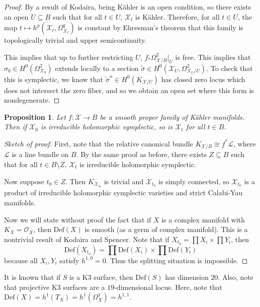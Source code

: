 \documentclass[leqno, openany]{memoir}
\newtheorem{prop}[thm]{Proposition}
\theoremstyle{definition}
\theoremstyle{remark}
\theoremstyle{plain}
\theoremstyle{definition}
\theoremstyle{remark}
\newcommand{\mc}[1]{\mathcal{#1}}
\newcommand{\mr}[1]{\mathrm{#1}}
\newcommand{\wt}[1]{\widetilde{#1}}
\begin{document}
\begin{proof}
    By a result of Kodaira, being K\"ahler is an open condition, so there exists an open $U \subseteq B$ such that for all $t \in U$, $\mc{X}_t$ is K\"ahler. Therefore, for all $t \in U$, the map $t \mapsto h^p(\mc{X}_t, \Omega_{\mc{X}_t}^q)$ is constant by Ehresman's theorem that this family is topologically trivial and upper semicontinuity.

    This implies that up to further restricting $U$, $f_* \Omega^2_{\mc{X}/B}|_U$ is free. This implies that $\sigma_0 \in H^0(\Omega^2_{\mc{X}_0})$ extends locally to a section $\wt{\sigma} \in H^0(\mc{X}_U, \Omega^2_{\mc{X}_U/U})$. To check that this is symplectic, we know that $\wt{\sigma}^n \in H^0(K_{\mc{X}/U})$ has closed zero locus which does not intersect the zero fiber, and so we obtain an open set where this form is nondegenerate.
\end{proof}

\begin{prop}
    Let $f \colon \mc{X} \to B$ be a smooth proper family of K\"ahler manifolds. Then if $\mc{X}_0$ is irreducible holomorphic symplectic, so is $\mc{X}_t$ for all $t \in B$.
\end{prop}

\begin{proof}[Sketch of proof]
    First, note that the relative canonical bundle $K_{\mc{X}/B} \cong f^* \mc{L}$, where $\mc{L}$ is a line bundle on $B$. By the same proof as before, there exists $Z \subseteq B$ such that for all $t \in B \setminus Z$, $\mc{X}_t$ is irreducible holomorphic symplectic.

    Now suppose $t_0 \in Z$. Then $K_{\mc{X}_{t_0}}$ is trivial and $\mc{X}_{t_0}$ is simply connected, so $\mc{X}_{t_0}$ is a product of irreducible holomorphic symplectic varieties and strict Calabi-Yau manifolds.

Now we will state without proof the fact that if $X$ is a complex manifold with $K_X = \mc{O}_X$, then $\mr{Def}(X)$ is smooth (as a germ of complex manifold). This is a nontrivial result of Kodaira and Spencer. Note that if $X_{t_0} = \prod X_i \times \prod Y_i$, then
    \[ \mr{Def}(X_{t_0}) = \prod \mr{Def}(X_i) \times \prod \mr{Def}(Y_i) \]
    because all $X_i, Y_i$ satisfy $h^{1,0} = 0$. Thus the splitting situation is impossible.
\end{proof}

It is known that if $S$ is a K3 surface, then $\mr{Def}(S)$ has dimension $20$. Also, note that projective K3 surfaces are a $19$-dimensional locus. Here, note that $\mr{Def}(X) = h^1(T_X) = h^1(\Omega^1_X) = h^{1,1}$.
\end{document}
